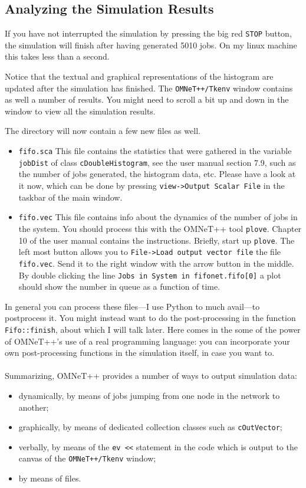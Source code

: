 \documentclass[a4paper]{article}
\begin{document}
\subsection{Analyzing the Simulation Results}
\label{sec:interpreting-results}
If you have not interrupted the simulation by pressing the big red
\texttt{STOP} button, the simulation will finish after having
generated 5010 jobs. On my linux machine this takes less than a
second.

Notice that the textual and graphical representations of the histogram
are updated after the simulation has finished. The
\texttt{OMNeT++/Tkenv} window contains as well a number of results.
You might need to scroll a bit up and down in the window to view all
the simulation results.

The directory will now contain a few new files as well.
\begin{itemize}
\item \texttt{fifo.sca} This file contains the statistics that were
  gathered in the variable \texttt{jobDist} of class
  \texttt{cDoubleHistogram}, see the user manual section 7.9, such as
  the number of jobs generated, the histogram data, etc. Please have a
  look at it now, which can be done by pressing \texttt{view->Output
    Scalar File} in the taskbar of the main window.  
\item \texttt{fifo.vec} This file contains info about the dynamics of
  the number of jobs in the system. You should process this with the
  OMNeT++ tool \texttt{plove}. Chapter 10 of the user manual contains
  the instructions.  Briefly, start up \texttt{plove}. The left most
  button allows you to \texttt{File->Load output vector file} the file
  \texttt{fifo.vec}. Send it to the right window with the arrow button
  in the middle. By double clicking the line \texttt{Jobs in System in
    fifonet.fifo[0]} a plot should show the number in queue as a
  function of time.
\end{itemize}

In general you can process these files---I use Python to much
avail---to postprocess it. You might instead want to do the
post-processing in the function \texttt{Fifo::finish}, about which I
will talk later. Here comes in the some of the power of OMNeT++'s use
of a real programming language: you can incorporate your own
post-processing functions in the simulation itself, in case you want
to.

\paragraph{}
Summarizing, OMNeT++ provides a number of ways to output simulation
data:
\begin{itemize}
\item dynamically, by means of jobs jumping from one node in the
  network to another;
\item graphically, by means of dedicated collection classes such as
  \texttt{cOutVector};
\item verbally, by means of the \texttt{ev <<} statement in the code
  which is output to the  canvas of the \texttt{OMNeT++/Tkenv} window;
\item by means of files.
\end{itemize}
\end{document}
